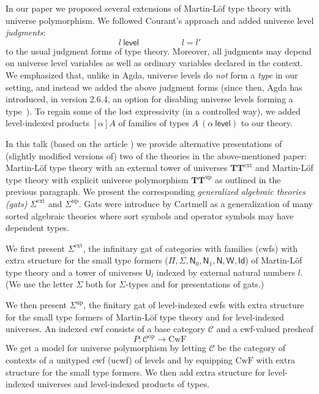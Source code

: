 \documentclass{easychair}
\newcommand{\Id}{\mathsf{Id}}
\newcommand{\level}{\mathsf{level}}
\newcommand{\op}{\mathrm{op}}
\newcommand{\N}{\mathsf{N}}
\def\U{\mathsf{U}}
\def\CwF{\mathrm{CwF}}
\def\C{\mathcal{C}}
\def\W{\mathsf{W}}
\def\Sigmaext{{\Sigma^\mathrm{ext}}}
\def\Sigmaint{{\Sigma^\mathrm{up}}}
\def\TText{{\mathbf{TT}^\mathrm{ext}}}
\def\TTint{{\mathbf{TT}^\mathrm{up}}}
\begin{document}
In our paper \cite{BezemCDE22} we proposed several extensions of Martin-Löf type theory with universe polymorphism. We followed Courant's approach \cite{Courant02} and added universe level {\em judgments}:
$$
l\ \level
\hspace{5em}
l = l'
$$
to the usual judgment forms of type theory. Moreover, all judgments may depend on universe level variables as well as ordinary variables declared in the context. We emphasized that, unlike in Agda, universe levels do {\em not} form a {\em type} in our setting, and instead we added the above judgment forms (since then, Agda has introduced, in version 2.6.4, an option for disabling universe levels forming a type~\cite{agda:leveluniv}).  To regain some of the lost expressivity (in a controlled way), we added level-indexed products $[\alpha]A$ of families of types $A\ (\alpha\ \level)$ to our theory.

In this talk (based on the article \cite{BezemCDE26}) we provide alternative presentations of (slightly modified versions of) two of the theories in the above-mentioned paper: Martin-Löf type theory with an external tower of universes $\TText$ and Martin-Löf type theory with explicit universe polymorphism $\TTint$ as outlined in the previous paragraph. We present the corresponding {\em generalized algebraic theories (gats)} $\Sigmaext$ and $\Sigmaint$. Gats were introduce by Cartmell \cite{cartmell:phd,cartmell:apal} as a generalization of many sorted algebraic theories where sort symbols and operator symbols may have dependent types. 


We first present $\Sigmaext$, the infinitary gat of categories with families (cwfs)  \cite{dybjer:torino} with extra structure for the small type formers ($\Pi, \Sigma, \N_0, \N_1, \N, \W, \Id$) of Martin-Löf type theory and a tower of universes $\U_l$ indexed by external natural numbers $l$. (We use the letter $\Sigma$ both for $\Sigma$-types and for presentations of gats.)

We then present $\Sigmaint$, the finitary gat of level-indexed cwfs with extra structure for the small type formers of Martin-Löf type theory and for level-indexed universes. An indexed cwf consists of a base category $\C$ and a cwf-valued presheaf
$$
P : \C^\op \to \CwF
$$
We get a model for universe polymorphism by letting $\C$ be the category of contexts of a unityped cwf (ucwf) of levels and by equipping $\CwF$ with extra structure for the small type formers. We then add extra structure for level-indexed universes and level-indexed products of types.
\end{document}
